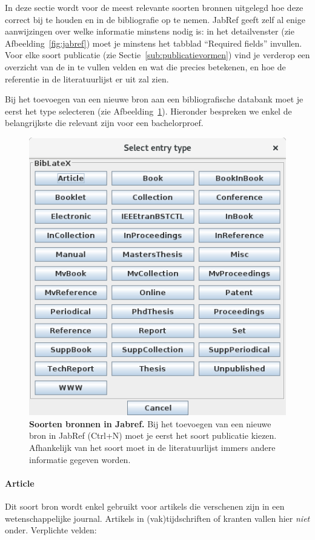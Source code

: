 In deze sectie wordt voor de meest relevante soorten bronnen uitgelegd hoe deze correct bij te houden en in de bibliografie op te nemen. JabRef geeft zelf al enige aanwijzingen over welke informatie minstens nodig is: in het detailvenster (zie Afbeelding~\ref{fig:jabref}) moet je minstens het tabblad ``Required fields'' invullen. Voor elke soort publicatie (zie Sectie~\ref{sub:publicatievormen}) vind je verderop een overzicht van de in te vullen velden en wat die precies betekenen, en hoe de referentie in de literatuurlijst er uit zal zien.

Bij het toevoegen van een nieuwe bron aan een bibliografische databank moet je eerst het type selecteren (zie Afbeelding~\ref{fig:jabref-entrytypes}). Hieronder bespreken we enkel de belangrijkste die relevant zijn voor een bachelorproef.

\begin{figure}
  \centering
  \includegraphics[width=0.6\linewidth]{img/jabref-entrytypes}
  \caption[Soorten bronnen in JabRef]{\textbf{Soorten bronnen in Jabref.} Bij het toevoegen van een nieuwe bron in JabRef (Ctrl+N) moet je eerst het soort publicatie kiezen. Afhankelijk van het soort moet in de literatuurlijst immers andere informatie gegeven worden.}
  \label{fig:jabref-entrytypes}
\end{figure}

\paragraph{Article}

Dit soort bron wordt enkel gebruikt voor artikels die verschenen zijn in een wetenschappelijke journal. Artikels in (vak)tijdschriften of kranten vallen hier \emph{niet} onder. Verplichte velden:

